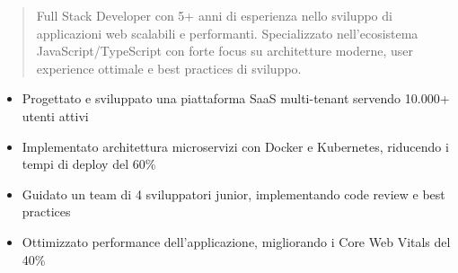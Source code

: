 \documentclass[10pt,a4paper,ragged2e,withhyper]{altacv}
\begin{document}
\makecvheader


\begin{quote}
Full Stack Developer con 5+ anni di esperienza nello sviluppo di applicazioni web scalabili e performanti. Specializzato nell'ecosistema JavaScript/TypeScript con forte focus su architetture moderne, user experience ottimale e best practices di sviluppo.
\end{quote}


\begin{itemize}
\item Progettato e sviluppato una piattaforma SaaS multi-tenant servendo 10.000+ utenti attivi
\item Implementato architettura microservizi con Docker e Kubernetes, riducendo i tempi di deploy del 60\%
\item Guidato un team di 4 sviluppatori junior, implementando code review e best practices
\item Ottimizzato performance dell'applicazione, migliorando i Core Web Vitals del 40\%
\end{itemize}
\end{document}
